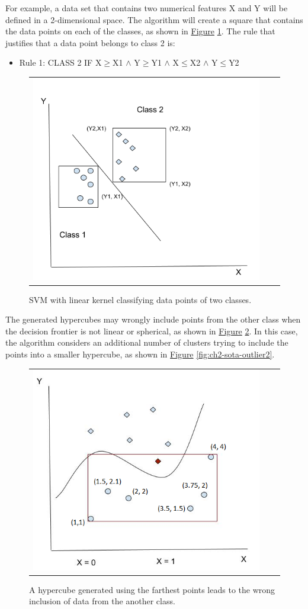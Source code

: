 For example, a data set that contains two numerical features X and Y will be defined in a 2-dimensional space. The algorithm will create a square that contains the data points on each of the classes, as shown in \hyperref[fig:ch2-sota-outlier0]{Figure} \ref{fig:ch2-sota-outlier0}. The rule that justifies that a data point belongs to class 2 is:
\begin{itemize}
    \item Rule 1: CLASS 2 IF X$\geq$X1 $\land$ Y$\geq$Y1 $\land$ X$\leq$X2 $\land$ Y$\leq$Y2
\end{itemize}

\begin{figure}[h!]
\centering
 \begin{tabular}{c@{\qquad}c@{\qquad}c}
\includegraphics[width=0.5\columnwidth]{figures/outlier_00.png}
  \end{tabular} 
  \caption{SVM with linear kernel classifying data points of two classes.\label{fig:ch2-sota-outlier0}}
\end{figure}

The generated hypercubes may wrongly include points from the other class when the decision frontier is not linear or spherical, as shown in \hyperref[fig:ch2-sota-outlier1]{Figure} \ref{fig:ch2-sota-outlier1}. In this case, the algorithm considers an additional number of clusters trying to include the points into a smaller hypercube, as shown in \hyperref[fig:ch2-sota-outlier2]{Figure} \ref{fig:ch2-sota-outlier2}.

\begin{figure}[h!]
\centering
  \begin{tabular}{c@{\qquad}c@{\qquad}c}
\includegraphics[width=0.5\columnwidth]{figures/outlier_01.png}
  \end{tabular} 
  \caption{A hypercube generated using the farthest points leads to the wrong inclusion of data from the another class.\label{fig:ch2-sota-outlier1}}
\end{figure}

